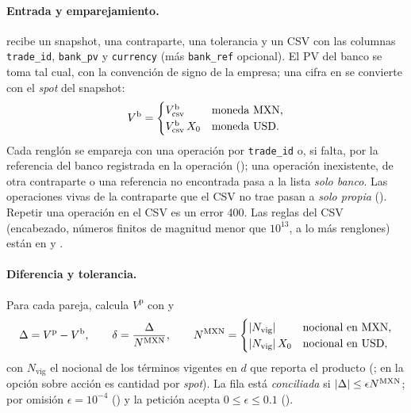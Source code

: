 \paragraph{Entrada y emparejamiento.}  recibe un snapshot, una contraparte, una tolerancia y un CSV con las columnas \texttt{trade\_id}, \texttt{bank\_pv} y \texttt{currency} (más \texttt{bank\_ref} opcional). El PV del banco se toma tal cual, con la convención de signo de la empresa; una cifra en \USD se convierte con el \emph{spot} del snapshot:
\begin{equation}\label{eq:cap11-banco-mxn}
  V^{\mathrm{b}} =
  \begin{cases}
    V^{\mathrm{b}}_{\mathrm{csv}} & \text{moneda \textup{MXN},}\\
    V^{\mathrm{b}}_{\mathrm{csv}}\,X_0 & \text{moneda \textup{USD}.}
  \end{cases}
\end{equation}
Cada renglón se empareja con una operación por \texttt{trade\_id} o, si falta, por la referencia del banco registrada en la operación (); una operación inexistente, de otra contraparte o una referencia no encontrada pasa a la lista \emph{solo banco}. Las operaciones vivas de la contraparte que el CSV no trae pasan a \emph{solo propia} (). Repetir una operación en el CSV es un error 400. Las reglas del CSV (encabezado, números finitos de magnitud menor que $10^{13}$, a lo más  renglones) están en  y .

\paragraph{Diferencia y tolerancia.} Para cada pareja,  calcula $V^{\mathrm{p}}$ con  y
\begin{equation}\label{eq:cap11-diferencia}
  \Delta = V^{\mathrm{p}} - V^{\mathrm{b}}, \qquad
  \delta = \frac{\Delta}{N^{\textup{MXN}}}, \qquad
  N^{\textup{MXN}} =
  \begin{cases}
    |N_{\mathrm{vig}}| & \text{nocional en \textup{MXN},}\\
    |N_{\mathrm{vig}}|\,X_0 & \text{nocional en \textup{USD},}
  \end{cases}
\end{equation}
con $N_{\mathrm{vig}}$ el nocional de los términos vigentes en $d$ que reporta el producto (; en la opción sobre acción es cantidad por \emph{spot}). La fila está \emph{conciliada} si $|\Delta| \le \epsilon N^{\textup{MXN}}$; por omisión $\epsilon = 10^{-4}$ () y la petición acepta $0 \le \epsilon \le 0.1$ ().

